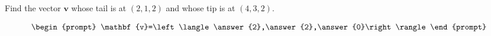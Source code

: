 \documentclass{ximera}
\author{Gregory Hartman \and Matthew Carr}
\begin{document}
\begin{exercise}





Find the vector $\mathbf{v}$ whose tail is at $(2,1,2)$ and whose tip is at $(4,3,2)$.

\[
\begin{prompt}
\mathbf{v}=\left\langle\answer{2},\answer{2},\answer{0}\right\rangle
\end{prompt}
\]

\end{exercise}
\end{document}
